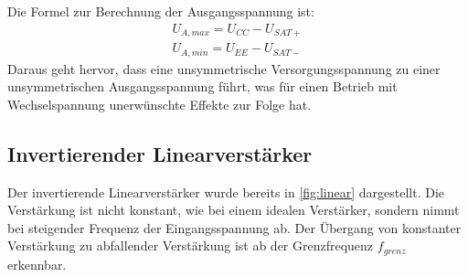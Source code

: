 Die Formel zur Berechnung der Ausgangsspannung ist:
\begin{equation}
    \begin{aligned}
        U_{A,max} = U_{CC} - U_{SAT+}\\
        U_{A,min} = U_{EE} - U_{SAT-}
    \end{aligned}
\end{equation}
Daraus geht hervor, dass eine unsymmetrische Versorgungsspannung zu einer unsymmetrischen Ausgangsspannung führt, was für einen Betrieb mit Wechselspannung unerwünschte Effekte zur Folge hat.\\

\subsection{Invertierender Linearverstärker}
Der invertierende Linearverstärker wurde bereits in \autoref{fig:linear} dargestellt.
Die Verstärkung ist nicht konstant, wie bei einem idealen Verstärker, sondern nimmt bei steigender Frequenz der Eingangsspannung ab.
Der Übergang von konstanter Verstärkung zu abfallender Verstärkung ist ab der Grenzfrequenz $f_{grenz}$ erkennbar.
